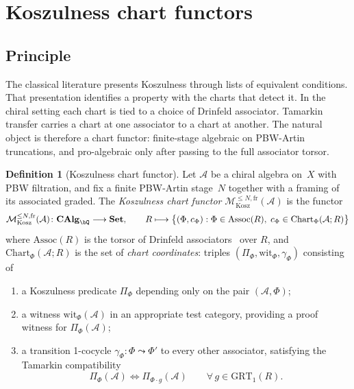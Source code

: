 \documentclass[11pt,reqno]{amsart}
\theoremstyle{definition}
\newtheorem{definition}[theorem]{Definition}
\theoremstyle{remark}
\newcommand{\cA}{\mathcal{A}}
\newcommand{\cM}{\mathcal{M}}
\numberwithin{equation}{section}
\begin{document}
\section{Koszulness chart functors}
\label{sec:moduli}

\subsection{Principle}

The classical literature presents Koszulness through lists of
equivalent conditions. That presentation identifies a property with
the charts that detect it. In the chiral setting each chart is tied
to a choice of Drinfeld associator. Tamarkin transfer carries a
chart at one associator to a chart at another. The natural object is
therefore a chart functor: finite-stage algebraic on PBW-Artin
truncations, and pro-algebraic only after passing to the full
associator torsor.

\begin{definition}[Koszulness chart functor]
\label{def:koszulness-moduli-scheme}
Let $\cA$ be a chiral algebra on~$X$ with PBW filtration, and fix
a finite PBW-Artin stage~$N$ together with a framing of its
associated graded. The \emph{Koszulness chart functor}
$\cM_{\mathrm{Kosz}}^{\leq N,\mathrm{fr}}(\cA)$ is the functor
\[
\cM_{\mathrm{Kosz}}^{\leq N,\mathrm{fr}}(\cA)\colon
\mathbf{CAlg}_\bQ \longrightarrow \mathbf{Set},
\qquad
R \longmapsto
\bigl\{(\Phi, c_\Phi) :
\Phi \in \mathrm{Assoc}(R),\;
c_\Phi \in \mathrm{Chart}_\Phi(\cA;R)\bigr\}
\]
where $\mathrm{Assoc}(R)$ is the torsor of Drinfeld
associators~\cite{Drinfeld90} over $R$, and
$\mathrm{Chart}_\Phi(\cA;R)$ is the set of \emph{chart coordinates}:
triples $(\Pi_\Phi, \mathrm{wit}_\Phi, \gamma_\Phi)$ consisting of
\begin{enumerate}[label=\textup{(\alph*)}]
\item a Koszulness predicate
  $\Pi_\Phi$ depending only on the pair
  $(\cA, \Phi)$;
\item a witness $\mathrm{wit}_\Phi(\cA)$ in an appropriate test
  category, providing a proof witness for
  $\Pi_\Phi(\cA)$;
\item a transition 1-cocycle
  $\gamma_\Phi \colon \Phi \leadsto \Phi'$
  to every other associator, satisfying the Tamarkin
  compatibility~\cite{Tamarkin03}
  \[
  \Pi_\Phi(\cA) \iff \Pi_{\Phi \cdot g}(\cA)
  \qquad \forall\,g \in \mathrm{GRT}_1(R).
  \]
\end{enumerate}
\end{definition}
\end{document}
